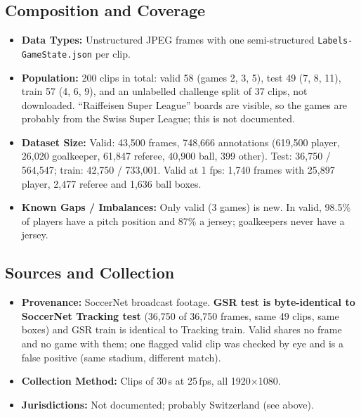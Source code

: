 \documentclass[11pt, a4paper]{article}
\begin{document}
\subsection{Composition and Coverage}
\begin{itemize}
    \item \textbf{Data Types:} Unstructured JPEG frames with one semi-structured \texttt{Labels-GameState.json} per clip.
    \item \textbf{Population:} 200 clips in total: valid 58 (games 2, 3, 5), test 49 (7, 8, 11), train 57 (4, 6, 9), and an unlabelled challenge split of 37 clips, not downloaded. ``Raiffeisen Super League'' boards are visible, so the games are probably from the Swiss Super League; this is not documented.
    \item \textbf{Dataset Size:} Valid: 43,500 frames, 748,666 annotations (619,500 player, 26,020 goalkeeper, 61,847 referee, 40,900 ball, 399 other). Test: 36,750 / 564,547; train: 42,750 / 733,001. Valid at 1 fps: 1,740 frames with 25,897 player, 2,477 referee and 1,636 ball boxes.
    \item \textbf{Known Gaps / Imbalances:} Only valid (3 games) is new. In valid, 98.5\% of players have a pitch position and 87\% a jersey; goalkeepers never have a jersey.
\end{itemize}

\subsection{Sources and Collection}
\begin{itemize}
    \item \textbf{Provenance:} SoccerNet broadcast footage. \textbf{GSR test is byte-identical to SoccerNet Tracking test} (36,750 of 36,750 frames, same 49 clips, same boxes) and GSR train is identical to Tracking train. Valid shares no frame and no game with them; one flagged valid clip was checked by eye and is a false positive (same stadium, different match).
    \item \textbf{Collection Method:} Clips of 30\,s at 25\,fps, all 1920$\times$1080.
    \item \textbf{Jurisdictions:} Not documented; probably Switzerland (see above).
\end{itemize}
\end{document}
